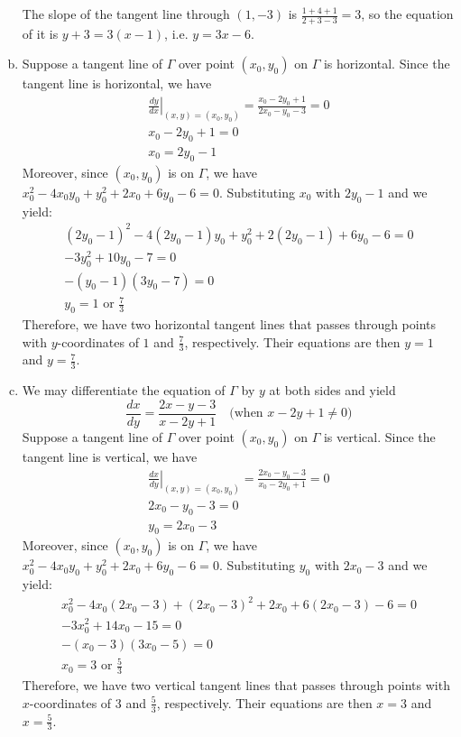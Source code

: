 \documentclass[11pt,letterpaper]{article}
\begin{document}
\begin{enumerate}[(a)]
    The slope of the tangent line through $(1, -3)$ is $\frac{1+4+1}{2+3-3} = 3$, so the equation of it is $y+3 = 3(x-1)$, i.e. $y = 3x - 6$.
    \item Suppose a tangent line of $\Gamma$ over point $(x_0, y_0)$ on $\Gamma$ is horizontal. Since the tangent line is horizontal, we have
    \begin{gather*}
        \left.\frac{dy}{dx}\right|_{(x, y)=(x_0, y_0)} = \frac{x_0-2y_0+1}{2x_0-y_0-3} = 0\\
        x_0-2y_0+1 = 0 \\
        x_0 = 2y_0-1
    \end{gather*}
    Moreover, since $(x_0, y_0)$ is on $\Gamma$, we have $x_0^2-4x_0y_0+y_0^2+2x_0+6y_0-6 = 0$.  Substituting $x_0$ with $2y_0 - 1$ and we yield:
    \begin{gather*}
        (2y_0-1)^2 - 4(2y_0-1)y_0 + y_0^2 + 2(2y_0-1)+6y_0-6 = 0\\
        -3y_0^2+10y_0-7 = 0\\
        -(y_0-1)(3y_0-7) = 0\\
        y_0 = 1 \text{ or } \frac{7}{3}
    \end{gather*}
    Therefore, we have two horizontal tangent lines that passes through points with $y$-coordinates of $1$ and $\frac{7}{3}$, respectively.  Their equations are then $y = 1$ and $y=\frac{7}{3}$.
    \item We may differentiate the equation of $\Gamma$ by $y$ at both sides and yield 
    \[\frac{dx}{dy}=\frac{2x-y-3}{x-2y+1} \quad \text{(when } x-2y+1 \ne 0 \text{)}\]
    Suppose a tangent line of $\Gamma$ over point $(x_0, y_0)$ on $\Gamma$ is vertical. Since the tangent line is vertical, we have
    \begin{gather*}
        \left.\frac{dx}{dy}\right|_{(x, y)=(x_0, y_0)} = \frac{2x_0-y_0-3}{x_0-2y_0+1} = 0\\
        2x_0-y_0-3 = 0 \\
        y_0 = 2x_0-3
    \end{gather*}
    Moreover, since $(x_0, y_0)$ is on $\Gamma$, we have $x_0^2-4x_0y_0+y_0^2+2x_0+6y_0-6 = 0$.  Substituting $y_0$ with $2x_0 - 3$ and we yield:
    \begin{gather*}
        x_0^2 - 4x_0(2x_0-3) + (2x_0-3)^2 + 2x_0 + 6(2x_0-3)-6 = 0\\
        -3x_0^2+14x_0-15 = 0\\
        -(x_0-3)(3x_0-5) = 0\\
        x_0 = 3 \text{ or } \frac{5}{3}
    \end{gather*}
    Therefore, we have two vertical tangent lines that passes through points with $x$-coordinates of $3$ and $\frac{5}{3}$, respectively.  Their equations are then $x = 3$ and $x=\frac{5}{3}$.
\end{enumerate}\vspace{6mm}
\end{document}

